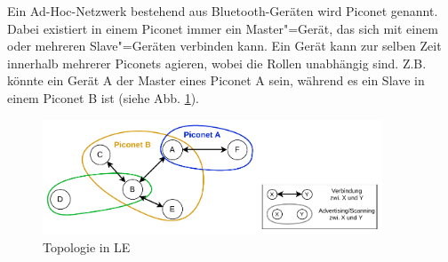 Ein Ad-Hoc-Netzwerk bestehend aus Bluetooth-Geräten wird Piconet genannt. Dabei existiert in einem Piconet immer ein Master"=Gerät, das sich mit einem oder mehreren Slave"=Geräten verbinden kann. Ein Gerät kann zur selben Zeit innerhalb mehrerer Piconets agieren, wobei die Rollen unabhängig sind. Z.B. könnte ein Gerät A der Master eines Piconet A sein, während es ein Slave in einem Piconet B ist (siehe Abb. \ref{fig: le topologie}). \cite{BtSpec4.0_181}

\begin{figure}[H]
    \centering
    \includegraphics[width=0.9\textwidth]{graphics/le_topologie.pdf}
    \caption[Topologie in LE]{Topologie in LE}
    \label{fig: le topologie}
\end{figure}